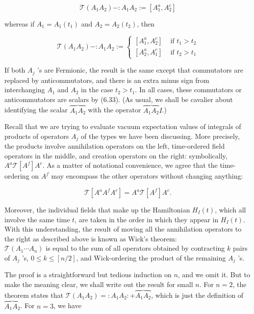 \documentclass[10pt, letterpaper]{article}
\begin{document}
$$
\mathcal{T}\left(A_{1} A_{2}\right)-: A_{1} A_{2}:=\left[A_{1}^{a}, A_{2}^{c}\right]
$$

whereas if $A_{1}=A_{1}\left(t_{1}\right)$ and $A_{2}=A_{2}\left(t_{2}\right)$, then

$$
\mathcal{T}\left(A_{1} A_{2}\right)-: A_{1} A_{2}:= \begin{cases}{\left[A_{1}^{a}, A_{2}^{c}\right]} & \text { if } t_{1}>t_{2} \\ {\left[A_{2}^{a}, A_{1}^{c}\right]} & \text { if } t_{2}>t_{1}\end{cases}
$$

If both $A_{j}$ 's are Fermionic, the result is the same except that commutators are replaced by anticommutators, and there is an extra minus sign from interchanging $A_{1}$ and $A_{2}$ in the case $t_{2}>t_{1}$. In all cases, these commutators or anticommutators are scalars by (6.33). (As usual, we shall be cavalier about identifying the scalar $\overbrace{A_{1} A_{2}}$ with the operator $\overbrace{A_{1} A_{2}} I$.)

Recall that we are trying to evaluate vacuum expectation values of integrals of products of operators $A_{j}$ of the types we have been discussing. More precisely, the products involve annihilation operators on the left, time-ordered field operators in the middle, and creation operators on the right: symbolically, $A^{a} \mathcal{T}\left[A^{f}\right] A^{c}$. As a matter of notational convenience, we agree that the time-ordering on $A^{f}$ may encompass the other operators without changing anything:

$$
\mathcal{T}\left[A^{a} A^{f} A^{c}\right]=A^{a} \mathcal{T}\left[A^{f}\right] A^{c} .
$$

Moreover, the individual fields that make up the Hamiltonian $H_{I}(t)$, which all involve the same time $t$, are taken in the order in which they appear in $H_{I}(t)$. With this understanding, the result of moving all the annihilation operators to the right as described above is known as Wick's theorem:\\
$\mathcal{T}\left(A_{1} \cdots A_{n}\right)$ is equal to the sum of all operators obtained by contracting $k$ pairs of $A_{j}$ 's, $0 \leq k \leq[n / 2]$, and Wick-ordering the product of the remaining $A_{j}$ 's.

The proof is a straightforward but tedious induction on $n$, and we omit it. But to make the meaning clear, we shall write out the result for small $n$. For $n=2$, the theorem states that $\mathcal{T}\left(A_{1} A_{2}\right)=: A_{1} A_{2}:+\overbrace{A_{1} A_{2}}$, which is just the definition of $\overbrace{A_{1} A_{2}}$. For $n=3$, we have
\end{document}
